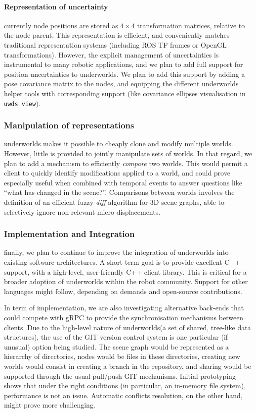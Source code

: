 \documentclass[conference]{IEEEtran}
\newcommand{\uwds}{{\sc underworlds}\xspace}
\begin{document}
\paragraph*{Representation of uncertainty} currently node positions are 
stored as $4\times4$ transformation matrices, relative to the node parent. This
representation is efficient, and conveniently matches traditional representation
systems (including ROS TF frames or OpenGL transformations). However, the explicit management
of uncertainties is instrumental to many robotic applications, and we plan to
add full support for position uncertainties to \uwds. We plan to add this
support by adding a pose covariance matrix to the nodes, and equipping the
different \uwds helper tools with corresponding support (like covariance
ellipses visualisation in {\tt uwds view}).


\subsubsection{Manipulation of representations} \uwds makes it possible to
cheaply clone and modify multiple worlds. However, little is provided to
jointly manipulate sets of worlds. In that regard, we plan to add a mechanism to
efficiently \emph{compare} two worlds. This would permit a client
to quickly identify modifications applied to a world, and could prove especially
useful when combined with temporal events to answer questions like ``what has
changed in the scene?''. Comparisons between worlds involves the definition of
an efficient fuzzy \emph{diff} algorithm for 3D scene graphs, able to
selectively ignore non-relevant micro displacements.

\subsubsection{Implementation and Integration} finally, we plan to continue to
improve the integration of \uwds into existing software architectures. A
short-term goal is to provide excellent C++ support, with a high-level,
user-friendly C++ client library. This is critical for a broader adoption of \uwds
within the robot community. Support for other languages might follow, depending
on demands and open-source contributions.

In term of implementation, we are also investigating alternative back-ends that
could compete with gRPC to provide the synchronisation mechanisms between
clients. Due to the high-level nature of \uwds (a set of shared, tree-like data
structures), the use of the GIT version control system is one particular (if
unusual) option being studied. The scene graph would be represented as a
hierarchy of directories, nodes would be files in these directories, creating
new worlds would consist in creating a branch in the repository, and sharing
would be supported through the usual pull/push GIT mechanisms. Initial
prototyping shows that under the right conditions (in particular, an in-memory
file system), performance is not an issue. Automatic conflicts resolution, on
the other hand, might prove more challenging.
\end{document}
